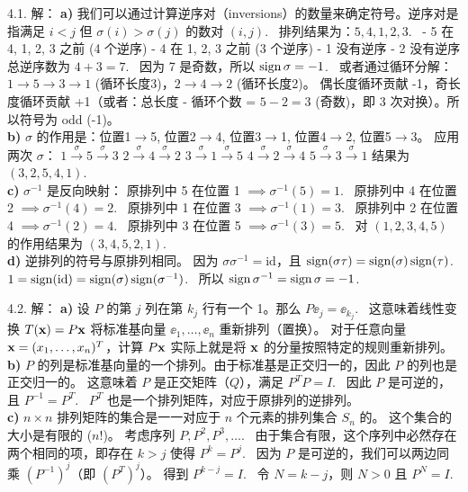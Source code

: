 \begin{exer}
\vspace{5ex}


4.1. 解：
\textbf{a)}
我们可以通过计算逆序对（inversions）的数量来确定符号。逆序对是指满足 $i < j$ 但 $\sigma(i) > \sigma(j)$ 的数对 $(i, j)$.~
排列结果为：$5, 4, 1, 2, 3$.~
- 5 在 4, 1, 2, 3 之前 (4 个逆序)
- 4 在 1, 2, 3 之前 (3 个逆序)
- 1 没有逆序
- 2 没有逆序
总逆序数为 $4 + 3 = 7$.~
因为 7 是奇数，所以 $\operatorname{sign} \sigma = -1$.~
或者通过循环分解：$1 \to 5 \to 3 \to 1$ (循环长度3)，$2 \to 4 \to 2$ (循环长度2)。
偶长度循环贡献 -1，奇长度循环贡献 +1（或者：总长度 - 循环个数 = $5 - 2 = 3$ (奇数)，即 3 次对换）。所以符号为 odd (-1)。
\\
\textbf{b)}
$\sigma$ 的作用是：位置1$\to$5, 位置2$\to$4, 位置3$\to$1, 位置4$\to$2, 位置5$\to$3。
应用两次 $\sigma$：
$1 \xrightarrow{\sigma} 5 \xrightarrow{\sigma} 3$
$2 \xrightarrow{\sigma} 4 \xrightarrow{\sigma} 2$
$3 \xrightarrow{\sigma} 1 \xrightarrow{\sigma} 5$
$4 \xrightarrow{\sigma} 2 \xrightarrow{\sigma} 4$
$5 \xrightarrow{\sigma} 3 \xrightarrow{\sigma} 1$
结果为 $(3, 2, 5, 4, 1)$.~
\\
\textbf{c)}
$\sigma^{-1}$ 是反向映射：
原排列中 5 在位置 1 $\implies \sigma^{-1}(5) = 1$.~
原排列中 4 在位置 2 $\implies \sigma^{-1}(4) = 2$.~
原排列中 1 在位置 3 $\implies \sigma^{-1}(1) = 3$.~
原排列中 2 在位置 4 $\implies \sigma^{-1}(2) = 4$.~
原排列中 3 在位置 5 $\implies \sigma^{-1}(3) = 5$.~
对 $(1, 2, 3, 4, 5)$ 的作用结果为 $(3, 4, 5, 2, 1)$.~
\\
\textbf{d)}
逆排列的符号与原排列相同。
因为 $\sigma \sigma^{-1} = \text{id}$，且 $\operatorname{sign}(\sigma \tau) = \operatorname{sign}(\sigma)\operatorname{sign}(\tau)$.~
$1 = \operatorname{sign}(\text{id}) = \operatorname{sign}(\sigma)\operatorname{sign}(\sigma^{-1})$.~
所以 $\operatorname{sign} \sigma^{-1} = \operatorname{sign} \sigma = -1$.~

4.2. 解：
\textbf{a)}
设 $P$ 的第 $j$ 列在第 $k_j$ 行有一个 1。那么 $P \ee_j = \ee_{k_j}$.~
这意味着线性变换 $T(\mathbf{x}) = P\mathbf{x}$ 将标准基向量 $\ee_1, \dots, \ee_n$ 重新排列（置换）。
对于任意向量 $\mathbf{x} = (x_1, \dots, x_n)^T$，计算 $P\mathbf{x}$ 实际上就是将 $\mathbf{x}$ 的分量按照特定的规则重新排列。
\\
\textbf{b)}
$P$ 的列是标准基向量的一个排列。由于标准基是正交归一的，因此 $P$ 的列也是正交归一的。
这意味着 $P$ 是正交矩阵（$Q$），满足 $P^T P = I$.~
因此 $P$ 是可逆的，且 $P^{-1} = P^T$.~
$P^T$ 也是一个排列矩阵，对应于原排列的逆排列。
\\
\textbf{c)}
$n \times n$ 排列矩阵的集合是一一对应于 $n$ 个元素的排列集合 $S_n$ 的。
这个集合的大小是有限的 ($n!$)。
考虑序列 $P, P^2, P^3, \dots$.~
由于集合有限，这个序列中必然存在两个相同的项，即存在 $k > j$ 使得 $P^k = P^j$.~
因为 $P$ 是可逆的，我们可以两边同乘 $(P^{-1})^j$（即 $(P^T)^j$）。
得到 $P^{k-j} = I$.~
令 $N = k - j$，则 $N > 0$ 且 $P^N = I$.~


\end{exer}
